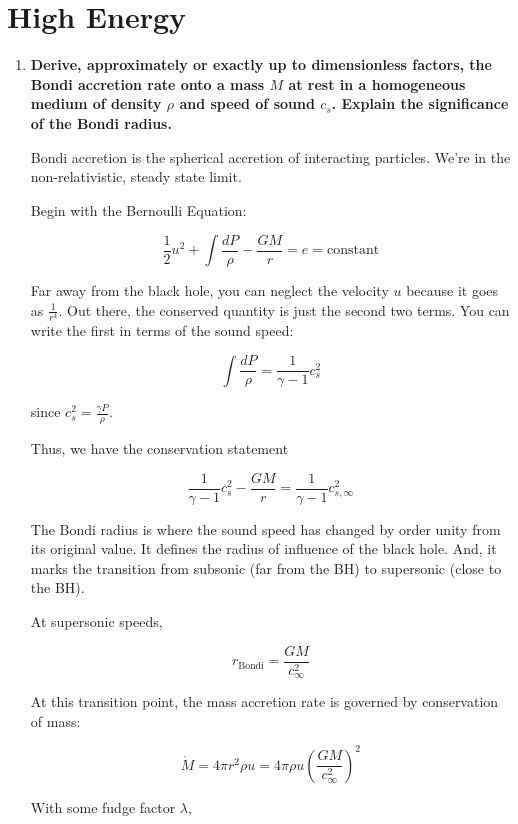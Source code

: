 \documentclass[12pt, letterpaper, preprint]{aastex}
\begin{document}
\section*{High Energy}

\begin{enumerate}

\item \textbf{Derive, approximately or exactly up to dimensionless factors, the Bondi accretion rate onto a mass $M$ at rest in a homogeneous medium of density $\rho$ and speed of sound $c_s$. Explain the significance of the Bondi radius.}

Bondi accretion is the spherical accretion of interacting particles. We're in the non-relativistic, steady state limit. 

Begin with the Bernoulli Equation:

\begin{equation}
\frac{1}{2} u^2 + \int \frac{dP}{\rho} - \frac{GM}{r} = e = \mathrm{constant}
\end{equation}

Far away from the black hole, you can neglect the velocity $u$ because it goes as $\frac{1}{r^4}$. Out there, the conserved quantity is just the second two terms. You can write the first in terms of the sound speed:

$$ \int \frac{dP}{\rho} = \frac{1}{\gamma-1} c_s^2 $$

since $c_s^2 = \frac{\gamma P}{\rho}$. 

Thus, we have the conservation statement

$$ \frac{1}{\gamma-1} c_s^2 - \frac{GM}{r} = \frac{1}{\gamma-1} c_{s,\infty}^2 $$

The Bondi radius is where the sound speed has changed by order unity from its original value. It defines the radius of influence of the black hole. And, it marks the transition from subsonic (far from the BH) to supersonic (close to the BH). 

At supersonic speeds, 

\begin{equation}
r_\mathrm{Bondi} = \frac{GM}{c^2_\infty}
\end{equation}

At this transition point, the mass accretion rate is governed by conservation of mass:

$$ \dot{M} = 4 \pi r^2 \rho u = 4 \pi \rho u \left(\frac{GM}{c^2_\infty}\right)^2 $$

With some fudge factor $\lambda$,


\end{enumerate}
\end{document}
